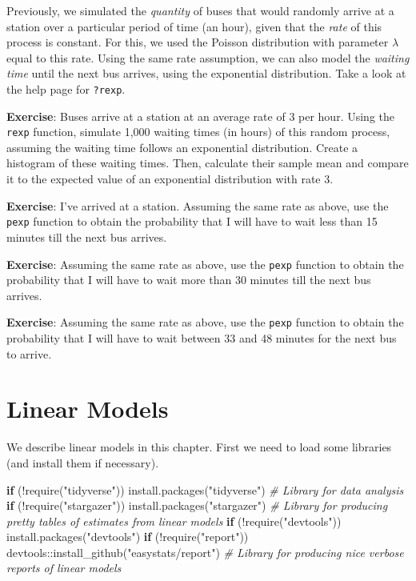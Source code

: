 \documentclass[
]{book}
\newenvironment{Shaded}{\begin{snugshade}}{\end{snugshade}}
\newcommand{\CommentTok}[1]{\textcolor[rgb]{0.56,0.35,0.01}{\textit{#1}}}
\newcommand{\ControlFlowTok}[1]{\textcolor[rgb]{0.13,0.29,0.53}{\textbf{#1}}}
\newcommand{\FunctionTok}[1]{\textcolor[rgb]{0.00,0.00,0.00}{#1}}
\newcommand{\NormalTok}[1]{#1}
\newcommand{\SpecialCharTok}[1]{\textcolor[rgb]{0.00,0.00,0.00}{#1}}
\newcommand{\StringTok}[1]{\textcolor[rgb]{0.31,0.60,0.02}{#1}}
\begin{document}
Previously, we simulated the \emph{quantity} of buses that would randomly arrive at a station over a particular period of time (an hour), given that the \emph{rate} of this process is constant. For this, we used the Poisson distribution with parameter \(\lambda\) equal to this rate. Using the same rate assumption, we can also model the \emph{waiting time} until the next bus arrives, using the exponential distribution. Take a look at the help page for \texttt{?rexp}.

\textbf{Exercise}: Buses arrive at a station at an average rate of 3 per hour. Using the \texttt{rexp} function, simulate 1,000 waiting times (in hours) of this random process, assuming the waiting time follows an exponential distribution. Create a histogram of these waiting times. Then, calculate their sample mean and compare it to the expected value of an exponential distribution with rate 3.

\textbf{Exercise}: I've arrived at a station. Assuming the same rate as above, use the \texttt{pexp} function to obtain the probability that I will have to wait less than 15 minutes till the next bus arrives.

\textbf{Exercise}: Assuming the same rate as above, use the \texttt{pexp} function to obtain the probability that I will have to wait more than 30 minutes till the next bus arrives.

\textbf{Exercise}: Assuming the same rate as above, use the \texttt{pexp} function to obtain the probability that I will have to wait between 33 and 48 minutes for the next bus to arrive.

\hypertarget{linear-models}{%
\chapter{Linear Models}\label{linear-models}}

We describe linear models in this chapter. First we need to load some libraries (and install them if necessary).

\begin{Shaded}
\begin{Highlighting}[]
\ControlFlowTok{if}\NormalTok{ (}\SpecialCharTok{!}\FunctionTok{require}\NormalTok{(}\StringTok{"tidyverse"}\NormalTok{)) }\FunctionTok{install.packages}\NormalTok{(}\StringTok{"tidyverse"}\NormalTok{) }\CommentTok{\# Library for data analysis}
\ControlFlowTok{if}\NormalTok{ (}\SpecialCharTok{!}\FunctionTok{require}\NormalTok{(}\StringTok{"stargazer"}\NormalTok{)) }\FunctionTok{install.packages}\NormalTok{(}\StringTok{"stargazer"}\NormalTok{) }\CommentTok{\# Library for producing pretty tables of estimates from linear models}
\ControlFlowTok{if}\NormalTok{ (}\SpecialCharTok{!}\FunctionTok{require}\NormalTok{(}\StringTok{"devtools"}\NormalTok{)) }\FunctionTok{install.packages}\NormalTok{(}\StringTok{"devtools"}\NormalTok{)}
\ControlFlowTok{if}\NormalTok{ (}\SpecialCharTok{!}\FunctionTok{require}\NormalTok{(}\StringTok{"report"}\NormalTok{)) devtools}\SpecialCharTok{::}\FunctionTok{install\_github}\NormalTok{(}\StringTok{"easystats/report"}\NormalTok{) }\CommentTok{\# Library for producing nice verbose reports of linear models}
\end{Highlighting}
\end{Shaded}
\end{document}
